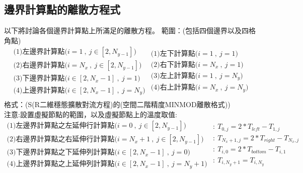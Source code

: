 \documentclass[12pt]{article}
\begin{document}
\subsection{邊界計算點的離散方程式}
\noindent 以下將討論各個邊界計算點上所滿足的離散方程。
\noindent 範圍：(包括四個邊界以及四格角點)
\[
\begin{array}{l}
    \text{(1)左邊界計算點($i = 1\ ,\ j \in [2,N_{y-1}]$)}\\[1.5ex]
    \text{(2)右邊界計算點($i = N_{x}\ ,\ j \in [2,N_{y-1}]$)}\\[1.5ex]
    \text{(3)下邊界計算點($i \in [2,N_{x}-1]\ ,\ j = 1$)}\\[1.5ex]
    \text{(4)上邊界計算點($i \in [2,N_{x}-1]\ ,\ j = N_{y}$)}\\[1.5ex]
\end{array}
\begin{array}{l}
    \text{(1)左下計算點($i = 1\ ,\ j = 1$)}\\[1.5ex]
    \text{(2)右下計算點($i = N_{x}\ ,\ j = 1$)}\\[1.5ex]
    \text{(3)左上計算點($i = 1\ ,\ j = N_{y}$)}\\[1.5ex]
    \text{(4)右上計算點($i = N_{x}\ ,\ j = N_{y}$)}\\[1.5ex]
\end{array}
\]
\noindent 格式：(S(R二維穩態擴散對流方程)的(空間二階精度MINMOD離散格式))\\[1.5ex]
注意:設置虛擬節點的範圍，以及虛擬節點上的溫度取值:
\[
\begin{array}{l}
    \text{(1)左邊界計算點之左延伸行計算點($i = 0\ ,\ j \in [2,N_{y-1}]$)}\\[1.5ex]
    \text{(2)右邊界計算點之右延伸行計算點($i = N_{x}+1\ ,\ j \in [2,N_{y-1}]$)}\\[1.5ex]
    \text{(3)下邊界計算點之下延伸列計算點($i \in [2,N_{x}-1]\ ,\ j = 0$)}\\[1.5ex]
    \text{(4)上邊界計算點之上延伸列計算點($i \in [2,N_{x}-1]\ ,\ j = N_{y}+1$)}\\[1.5ex]
\end{array}
\begin{array}{l}
    :\ T_{0,j} = 2*T_{left} - T_{1,j}\\[1.5ex]
    :\ T_{N_{x}+1,j} = 2*T_{right} - T_{N_{x},j}\\[1.5ex]
    :\ T_{i,0} = 2*T_{bottom} - T_{i,1}\\[1.5ex]
    :\ T_{i,N_{y}+1} = T_{i,N_{y}}\\[1.5ex]
\end{array}
\]
\end{document}
